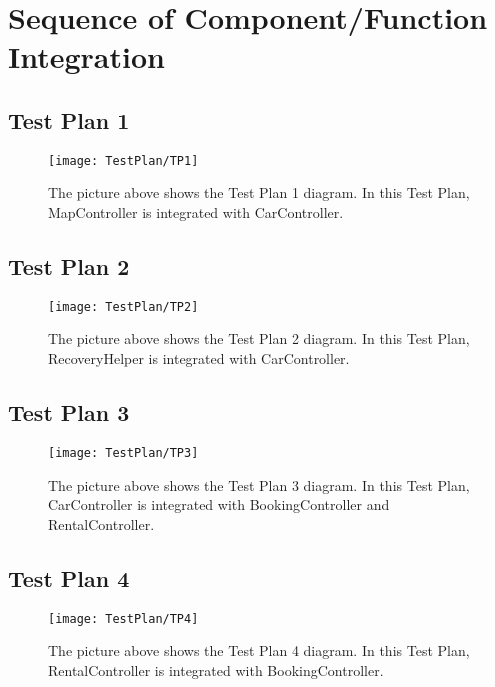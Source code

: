 
\section{Sequence of Component/Function Integration}
\blindtext

\subsection{Test Plan 1}
\blindtext
\begin{figure}[H]
	\centering
	\texttt{[image: TestPlan/TP1]}
	\caption[Test Plan 1 diagram]{The picture above shows the Test Plan 1 diagram. In this Test Plan, MapController is integrated with CarController.}
	\label{fig:TestPlan-1}
\end{figure}

\subsection{Test Plan 2}
\blindtext
\begin{figure}[H]
	\centering
	\texttt{[image: TestPlan/TP2]}
	\caption[Test Plan 2 diagram]{The picture above shows the Test Plan 2 diagram. In this Test Plan, RecoveryHelper is integrated with CarController.}
	\label{fig:TestPlan-2}
\end{figure}

\subsection{Test Plan 3}
\blindtext
\begin{figure}[H]
	\centering
	\texttt{[image: TestPlan/TP3]}
	\caption[Test Plan 3 diagram]{The picture above shows the Test Plan 3 diagram. In this Test Plan, CarController is integrated with BookingController and RentalController.}
	\label{fig:TestPlan-3}
\end{figure}

\subsection{Test Plan 4}
\blindtext
\begin{figure}[H]
	\centering
	\texttt{[image: TestPlan/TP4]}
	\caption[Test Plan 4 diagram]{The picture above shows the Test Plan 4 diagram. In this Test Plan, RentalController is integrated with BookingController.}
	\label{fig:TestPlan-4}
\end{figure}

